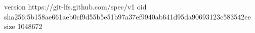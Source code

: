version https://git-lfs.github.com/spec/v1
oid sha256:5b158ae661aeb0cf9d55b5e51b97a37ef9940ab641d95da90693123c583542ee
size 1048672
